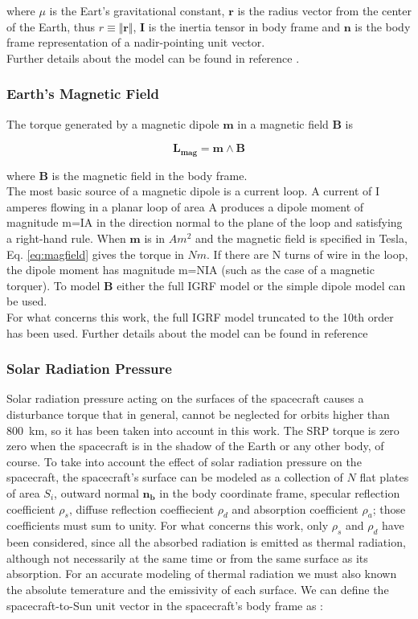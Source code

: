 \documentclass[11pt,a4paper]{report}
\begin{document}
where $\mu$ is the Eart's gravitational constant, $\textbf{r}$ is the radius vector from the center of the Earth, thus $r \equiv \Vert{\textbf{r}}\Vert$, $\textbf{I}$ is the inertia tensor in body frame and $\textbf{n}$ is the body frame representation of a nadir-pointing unit vector.\\
Further details about the model can be found in reference \cite{Ref:Books:Fundamentals}.

\subsubsection{Earth's Magnetic Field}
The torque generated by a magnetic dipole $\textbf{m}$ in a magnetic field $\textbf{B}$ is

\begin{equation}
 \mathbf{L_{mag}} = \mathbf{m} \wedge \mathbf{B}
 \label{eq:magfield}
\end{equation}

where $\mathbf{B}$ is the magnetic field in the body frame.\\
The most basic source of a magnetic dipole is a current loop. A current of I amperes flowing in a planar loop of area A produces a dipole moment of magnitude m=IA in the direction normal to the plane of the loop and satisfying a right-hand rule.
When $\textbf{m}$ is in $Am^2$ and the magnetic field is specified in Tesla, Eq. \ref{eq:magfield} gives the torque in $Nm$. If there are N turns of wire in the loop, the dipole moment has magnitude m=NIA (such as the case of a magnetic torquer).
To model $\textbf{B}$ either the full IGRF model or the simple dipole model can be used.\\
For what concerns this work, the full IGRF model truncated to the 10th order has been used. Further details about the model can be found in reference \cite{Ref:Articles:IGRF}

\subsubsection{Solar Radiation Pressure}
Solar radiation pressure acting on the surfaces of the spacecraft causes a disturbance torque that in general, cannot be neglected for orbits higher than \SI{800}{\kilo\meter}, so it has been taken into account in this work.
The SRP torque is zero zero when the spacecraft is in the shadow of the Earth or any other body, of course.
To take into account the effect of solar radiation pressure on the spacecraft, the spacecraft's surface can be modeled as a collection of $N$ flat plates of area $S_{i}$, outward normal $\mathbf{n_{b}}$ in the body coordinate frame, specular reflection coefficient $\rho_s$, diffuse reflection coeffiecient $\rho_{d}$ and absorption coefficient $\rho_{a}$; those coefficients must sum to unity.
For what concerns this work, only $\rho_s$ and $\rho_d$ have been considered, since all the absorbed radiation is emitted as thermal radiation,  although not necessarily at the same time or from the same surface as its absorption.
For an accurate modeling of thermal radiation we must also known the absolute temerature and the emissivity of each surface.
We can define the spacecraft-to-Sun unit vector in the spacecraft's body frame as : 
\end{document}
